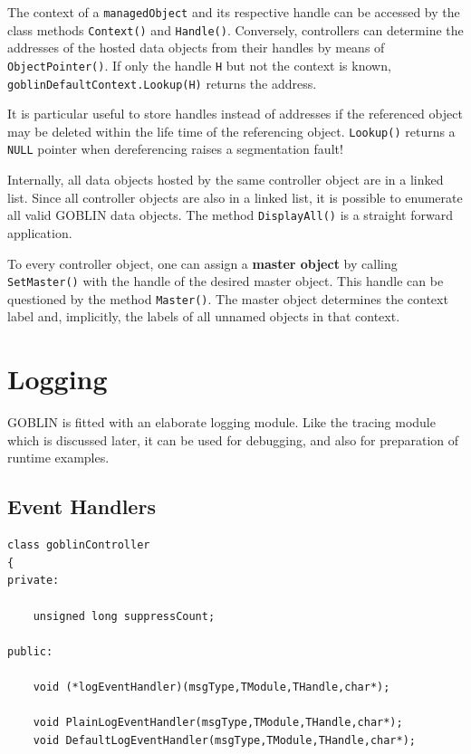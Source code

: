 \documentclass[a4paper,11pt,twoside]{book}
\begin{document}
\begin{multicols}{2}
The context of a \verb/managedObject/ and its respective handle can be
accessed by the class methods \verb/Context()/ and \verb/Handle()/. Conversely,
controllers can determine the addresses of the hosted data objects from their
handles by means of \verb/ObjectPointer()/. If only the handle \verb/H/ but not
the context is known, \verb/goblinDefaultContext.Lookup(H)/ returns the address.

It is particular useful to store handles instead of addresses if the referenced
object may be deleted within the life time of the referencing object.
\verb/Lookup()/ returns a \verb/NULL/ pointer when dereferencing raises a
segmentation fault!

Internally, all data objects hosted by the same controller object are in a
linked list. Since all controller objects are also in a linked list, it is
possible to enumerate all valid GOBLIN data objects. The method
\verb/DisplayAll()/ is a straight forward application.

To every controller object, one can assign a {\bf master object} by calling
\verb/SetMaster()/ with the handle of the desired master object. This handle
can be questioned by the method \verb/Master()/. The master object determines
the context label and, implicitly, the labels of all unnamed objects in that
context.



\section{Logging}
\label{slb_logging}
GOBLIN is fitted with an elaborate logging module. Like the tracing module
which is discussed later, it can be used for debugging, and also for
preparation of runtime examples.


\subsection{Event Handlers}
\begin{mymethods}
\begin{verbatim}
class goblinController
{
private:
    
    unsigned long suppressCount;

public:
    
    void (*logEventHandler)(msgType,TModule,THandle,char*);

    void PlainLogEventHandler(msgType,TModule,THandle,char*);
    void DefaultLogEventHandler(msgType,TModule,THandle,char*);


\end{verbatim}
\end{mymethods}
\end{multicols}
\end{document}
